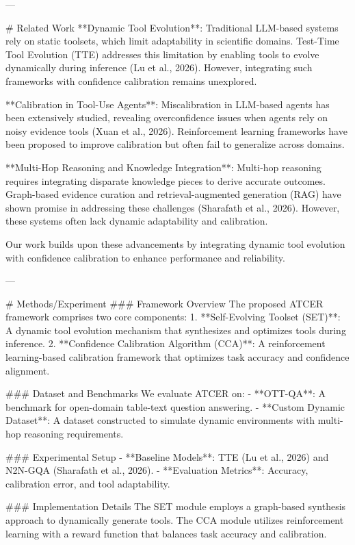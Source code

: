 ---

# Related Work
**Dynamic Tool Evolution**: Traditional LLM-based systems rely on static toolsets, which limit adaptability in scientific domains. Test-Time Tool Evolution (TTE) addresses this limitation by enabling tools to evolve dynamically during inference (Lu et al., 2026). However, integrating such frameworks with confidence calibration remains unexplored.

**Calibration in Tool-Use Agents**: Miscalibration in LLM-based agents has been extensively studied, revealing overconfidence issues when agents rely on noisy evidence tools (Xuan et al., 2026). Reinforcement learning frameworks have been proposed to improve calibration but often fail to generalize across domains.

**Multi-Hop Reasoning and Knowledge Integration**: Multi-hop reasoning requires integrating disparate knowledge pieces to derive accurate outcomes. Graph-based evidence curation and retrieval-augmented generation (RAG) have shown promise in addressing these challenges (Sharafath et al., 2026). However, these systems often lack dynamic adaptability and calibration.

Our work builds upon these advancements by integrating dynamic tool evolution with confidence calibration to enhance performance and reliability.

---

# Methods/Experiment
### Framework Overview
The proposed ATCER framework comprises two core components:
1. **Self-Evolving Toolset (SET)**: A dynamic tool evolution mechanism that synthesizes and optimizes tools during inference.
2. **Confidence Calibration Algorithm (CCA)**: A reinforcement learning-based calibration framework that optimizes task accuracy and confidence alignment.

### Dataset and Benchmarks
We evaluate ATCER on:
- **OTT-QA**: A benchmark for open-domain table-text question answering.
- **Custom Dynamic Dataset**: A dataset constructed to simulate dynamic environments with multi-hop reasoning requirements.

### Experimental Setup
- **Baseline Models**: TTE (Lu et al., 2026) and N2N-GQA (Sharafath et al., 2026).
- **Evaluation Metrics**: Accuracy, calibration error, and tool adaptability.

### Implementation Details
The SET module employs a graph-based synthesis approach to dynamically generate tools. The CCA module utilizes reinforcement learning with a reward function that balances task accuracy and calibration.


